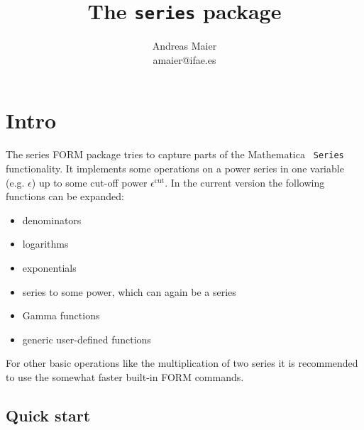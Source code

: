 \documentclass[titlepage]{article}
\begin{document}
\title{The \texttt{series} package}
\author{Andreas Maier\\amaier@ifae.es}
\maketitle

\tableofcontents

\section{Intro}

The series FORM package tries to capture parts of the Mathematica {\tt
  Series} functionality. It implements some operations on a power
series in one variable
(e.g. $\epsilon$) up to some cut-off power $\epsilon^{\text{cut}}$. In
the current version the following functions can be expanded:
\begin{itemize}
\item denominators
\item logarithms
\item exponentials
\item series to some power, which can again be a series
\item Gamma functions
\item generic user-defined functions
\end{itemize}
For other basic operations like the multiplication of two series it
is recommended to use the somewhat faster built-in FORM commands.

\subsection{Quick start}
\label{sec:quick}
\end{document}

